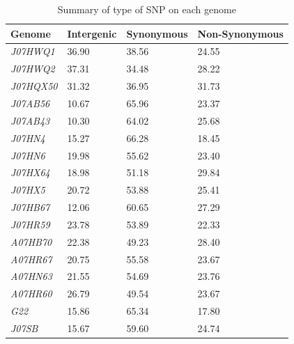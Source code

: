 
\begin{table}[ht]
  \caption{Summary of type of SNP on each genome}
  \begin{tabularx}{\textwidth}{L{2.1cm}R{2.3cm}R{3cm}R{3.8cm}}
  \hline
    \textbf{Genome} & \textbf{Intergenic} & \textbf{Synonymous} & \textbf{Non-Synonymous}\\
    \hline
     \textit{J07HWQ1} & 36.90 & 38.56 & 24.55 \\
     \textit{J07HWQ2} & 37.31 & 34.48 & 28.22 \\
     \textit{J07HQX50} & 31.32 & 36.95 & 31.73 \\
     \textit{J07AB56} & 10.67 & 65.96 & 23.37 \\
     \textit{J07AB43} & 10.30 & 64.02 & 25.68 \\
     \textit{J07HN4} & 15.27 & 66.28 & 18.45 \\
     \textit{J07HN6} &  19.98 & 55.62 & 23.40\\
     \textit{J07HX64} & 18.98 & 51.18 & 29.84 \\
     \textit{J07HX5} & 20.72 & 53.88 & 25.41 \\
     \textit{J07HB67} & 12.06 & 60.65 & 27.29 \\
     \textit{J07HR59} & 23.78 & 53.89 & 22.33 \\
     \textit{A07HB70} & 22.38 & 49.23 & 28.40 \\
     \textit{A07HR67} & 20.75 & 55.58 & 23.67 \\
     \textit{A07HN63} & 21.55 & 54.69 & 23.76 \\
     \textit{A07HR60} & 26.79 & 49.54 & 23.67 \\
     \textit{G22} & 15.86 & 65.34 & 17.80 \\
     \textit{J07SB} & 15.67 & 59.60 & 24.74 \\     
  \end{tabularx}
  \label{TypeSNP_SummaryGenome}
\end{table}

